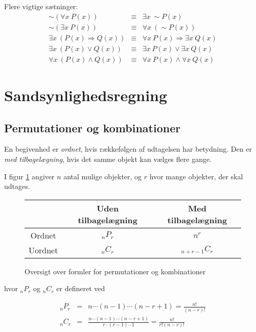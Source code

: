 \documentclass[a4paper]{article}
\begin{document}
Flere vigtige sætninger:
\begin{eqnarray}
\sim (\forall x~P(x)) &\equiv& \exists x~\sim P(x) \\
\sim (\exists x~P(x)) &\equiv& \forall x~(\sim P(x)) \\
\exists x~(P(x) \Rightarrow Q(x)) &\equiv& \forall x~P(x) \Rightarrow \exists x~Q(x) \\
\exists x~(P(x) \vee Q(x)) &\equiv& \exists x~P(x) \vee \exists x~Q(x) \\
\forall x~(P(x) \wedge Q(x)) &\equiv& \forall x~P(x) \wedge \forall x~Q(x)
\end{eqnarray}

\section{Sandsynlighedsregning}

\subsection{Permutationer og kombinationer}
En begivenhed er {\it ordnet}, hvis rækkefølgen af udtagelsen har betydning. Den er
{\it med tilbagelægning}, hvis det samme objekt kan vælges flere gange.

I figur \ref{fig:perm} angiver $n$ antal mulige objekter, og $r$ hvor mange objekter,
der skal udtages.

\begin{figure}[h!]
    \begin{center}
    \begin{tabular}{|c|c|c|}
        \hline
        & Uden tilbagelægning & Med tilbagelægning \\
        \hline
        Ordnet  & $_nP_r$ & $n^r$ \\
        \hline
        Uordnet & $_nC_r$ & $_{n+r-1}C_r$ \\
        \hline
    \end{tabular}
    \end{center}
    \caption{Oversigt over formler for permutationer og kombinationer} \label{fig:perm}
\end{figure}

hvor $_nP_r$ og $_nC_r$ er defineret ved

\begin{eqnarray*}
    _nP_r &=& n\cdots{}(n-1)\cdots{}(n-r+1) = \frac{n!}{(n-r)!} \\
    _nC_r &=& \frac{n\cdots (n-1) \cdots (n-r+1)}{r\cdot (r-1)\cdots 1} = \frac{n!}{r!(n-r)!}
\end{eqnarray*}
\end{document}
